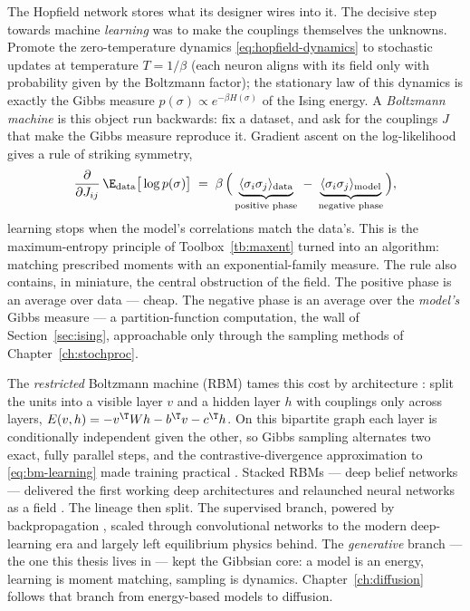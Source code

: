 The Hopfield network stores what its designer wires into it. The decisive
step towards machine \emph{learning} was to make the couplings themselves
the unknowns. Promote the zero-temperature dynamics
\eqref{eq:hopfield-dynamics} to stochastic updates at temperature
$T = 1/\beta$ (each neuron aligns with its field only with probability given
by the Boltzmann factor); the stationary law of this dynamics is exactly the
Gibbs measure $p(\sigma) \propto e^{-\beta H(\sigma)}$ of the Ising energy.
A \emph{Boltzmann machine} \citep{ackley1985learning} is this object run
backwards: fix a dataset, and ask for the couplings $J$ that make the Gibbs
measure reproduce it. Gradient ascent on the log-likelihood gives a rule of
striking symmetry,
\begin{equation}
  \frac{\partial}{\partial J_{ij}} \,\E_{\text{data}}\big[\log p(\sigma)\big]
  \;=\; \beta\,\Big(
  \underbrace{\langle \sigma_i \sigma_j \rangle_{\text{data}}}_{\text{positive phase}}
  \;-\;
  \underbrace{\langle \sigma_i \sigma_j \rangle_{\text{model}}}_{\text{negative phase}}
  \Big),
  \label{eq:bm-learning}
\end{equation}
learning stops when the model's correlations match the data's. This is the
maximum-entropy principle of Toolbox~\ref{tb:maxent} turned into an
algorithm: matching
prescribed moments with an exponential-family measure. The rule also
contains, in miniature, the central obstruction of the field. The positive
phase is an average over data --- cheap. The negative phase is an average
over the \emph{model's} Gibbs measure --- a partition-function computation,
the wall of Section~\ref{sec:ising}, approachable only through the sampling
methods of Chapter~\ref{ch:stochproc}.

The \emph{restricted} Boltzmann machine (RBM) tames this cost by
architecture \citep{smolensky1986information}: split the units into a
visible layer $v$ and a hidden layer $h$ with couplings only across layers,
$E(v,h) = -v^\T W h - b^\T v - c^\T h$. On this bipartite graph each layer
is conditionally independent given the other, so Gibbs sampling alternates
two exact, fully parallel steps, and the contrastive-divergence
approximation to \eqref{eq:bm-learning} made training practical
\citep{hinton2002training}. Stacked RBMs --- deep belief networks ---
delivered the first working deep architectures and relaunched neural
networks as a field \citep{hinton2006fast}. The lineage then split. The
supervised branch, powered by backpropagation
\citep{rumelhart1986learning}, scaled through convolutional networks to the
modern deep-learning era \citep{krizhevsky2012imagenet, lecun2015deep} and
largely left equilibrium physics behind. The \emph{generative} branch ---
the one this thesis lives in --- kept the Gibbsian core: a model is an
energy, learning is moment matching, sampling is dynamics. Chapter~\ref{ch:diffusion}
follows that branch from energy-based models to diffusion.

